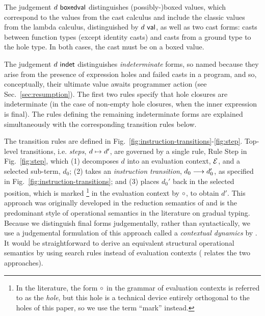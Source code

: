 The judgement $d~\mathsf{boxedval}$ distinguishes (possibly-)boxed values, which correspond to the values from the cast calculus and include the classic values from the lambda calculus, distinguished by $d~\mathsf{val}$, as well as two cast forms: 
casts between function types (except identity casts) 
and casts from a ground type to the hole type. In both cases, the cast must be on a boxed value.

The judgement $d~\mathsf{indet}$ distinguishes \emph{indeterminate} forms, 
so named because they arise from the presence of expression holes and failed casts in a program, and so, conceptually, their ultimate value awaits programmer action (see Sec.~\ref{sec:resumption}). 
The first two rules specify that hole closures are indeterminate (in the case of non-empty hole closures, when the inner expression is final). 
The rules defining the remaining indeterminate forms are explained simultaneously with the corresponding transition rules below.



The transition rules are defined in Fig.~\ref{fig:instruction-transitions}-\ref{fig:step}. 
Top-level transitions, i.e. \emph{steps}, $d \mapsto d'$, are governed by a single rule, Rule {Step} in Fig.~\ref{fig:step}, which 
(1) decomposes $d$ into an evaluation context, $\mathcal{E}$, and a selected sub-term, $d_0$; 
(2) takes an \emph{instruction transition}, $d_0 \longrightarrow d_0'$, as specified in Fig.~\ref{fig:instruction-transitions}; 
and (3) places $d_0'$ back in the selected position, which is marked%
\footnote{In the literature, the form $\circ$ in the grammar of evaluation contexts is referred to as the \emph{hole}, but this hole is a technical device entirely orthogonal to the holes of this paper, so we use the term ``mark'' instead.} 
in the evaluation context by $\circ$, to obtain $d'$.
This approach was originally developed in the reduction semantics of \citet{DBLP:journals/tcs/FelleisenH92} and is the predominant style of operational semantics in the literature on gradual typing. 
Because we distinguish final forms judgementally, rather than syntactically, we use a judgemental formulation of this approach called a \emph{contextual dynamics} by \citet{pfpl}. 
It would be straightforward to derive an equivalent structural operational semantics \cite{DBLP:journals/jlp/Plotkin04a} by using search rules instead of evaluation contexts (\citet{pfpl} relates the two approaches).



